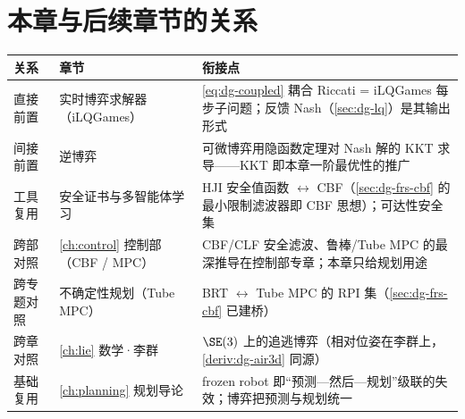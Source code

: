 \section*{本章与后续章节的关系}
\begin{table}[H]\centering\small
\begin{tabularx}{\linewidth}{llL}
\toprule
关系 & 章节 & 衔接点 \\
\midrule
直接前置 & 实时博弈求解器（iLQGames） & \cref{eq:dg-coupled} 耦合 Riccati = iLQGames 每步子问题；反馈 Nash（\cref{sec:dg-lq}）是其输出形式 \\
间接前置 & 逆博弈 & 可微博弈用隐函数定理对 Nash 解的 KKT 求导——KKT 即本章一阶最优性的推广 \\
工具复用 & 安全证书与多智能体学习 & HJI 安全值函数 $\leftrightarrow$ CBF（\cref{sec:dg-frs-cbf} 的最小限制滤波器即 CBF 思想）；可达性安全集 \\
跨部对照 & \cref{ch:control} 控制部（CBF / MPC） & CBF/CLF 安全滤波、鲁棒/Tube MPC 的最深推导在控制部专章；本章只给规划用途 \\
跨专题对照 & 不确定性规划（Tube MPC） & BRT $\leftrightarrow$ Tube MPC 的 RPI 集（\cref{sec:dg-frs-cbf} 已建桥） \\
跨章对照 & \cref{ch:lie} 数学·李群 & $\SE(3)$ 上的追逃博弈（相对位姿在李群上，\cref{deriv:dg-air3d} 同源） \\
基础复用 & \cref{ch:planning} 规划导论 & frozen robot 即“预测—然后—规划”级联的失效；博弈把预测与规划统一 \\
\bottomrule
\end{tabularx}
\end{table}

